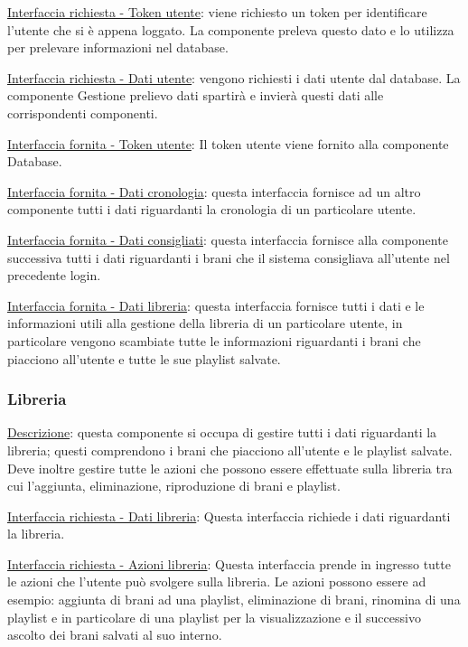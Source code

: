 \documentclass[a4paper,12pt]{article}
\begin{document}
\underline{Interfaccia richiesta - Token utente}: viene richiesto un token per identificare l’utente che si è appena loggato.  La componente preleva questo dato e lo utilizza per prelevare informazioni nel database.

\underline{Interfaccia richiesta - Dati utente}: vengono richiesti i dati utente dal database. La componente Gestione prelievo dati spartirà e invierà questi dati alle corrispondenti componenti.

\underline{Interfaccia fornita - Token utente}: Il token utente viene fornito alla componente Database.

\underline{Interfaccia fornita - Dati cronologia}: questa interfaccia fornisce ad un altro componente tutti i dati riguardanti la cronologia di un particolare utente.

\underline{Interfaccia fornita - Dati consigliati}: questa interfaccia fornisce alla componente successiva tutti i dati riguardanti i brani che il sistema consigliava all’utente nel precedente login.  

\underline{Interfaccia fornita - Dati libreria}: questa interfaccia fornisce tutti i dati e le informazioni utili alla gestione della libreria di un particolare utente, in particolare vengono scambiate tutte le informazioni riguardanti i brani che piacciono all’utente e tutte le sue playlist salvate.

\subsubsection{Libreria}

\underline{Descrizione}: questa componente si occupa di gestire tutti i dati riguardanti la libreria; questi comprendono i brani che piacciono all’utente e le playlist salvate. Deve inoltre gestire tutte le azioni che possono essere effettuate sulla libreria tra cui l’aggiunta, eliminazione, riproduzione di brani e playlist.

\underline{Interfaccia richiesta - Dati libreria}: Questa interfaccia richiede i dati riguardanti la libreria.

\underline{Interfaccia richiesta - Azioni libreria}: Questa interfaccia prende in ingresso tutte le azioni che l’utente può svolgere sulla libreria. Le azioni possono essere ad esempio: aggiunta di brani ad una playlist, eliminazione di brani, rinomina di una playlist e in particolare di una playlist per la visualizzazione e il successivo ascolto dei brani salvati al suo interno.
\end{document}

